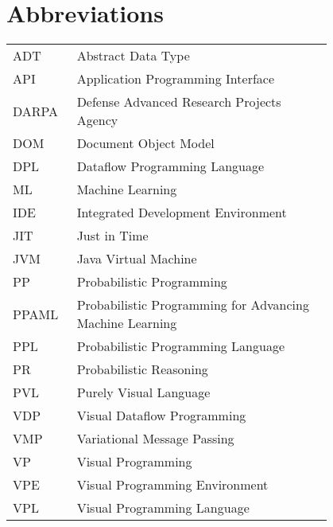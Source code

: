 \chapter*{Abbreviations}

\begin{flushleft}
\begin{tabular}{l p{0.8\linewidth}}
ADT      & Abstract Data Type\\
API      & Application Programming Interface\\
DARPA    & Defense Advanced Research Projects Agency\\
DOM      & Document Object Model\\
DPL      & Dataflow Programming Language\\
ML       & Machine Learning\\
IDE      & Integrated Development Environment\\
JIT      & Just in Time\\
JVM      & Java Virtual Machine\\
PP       & Probabilistic Programming\\
PPAML    & Probabilistic Programming for Advancing Machine Learning\\
PPL      & Probabilistic Programming Language\\
PR       & Probabilistic Reasoning\\
PVL      & Purely Visual Language\\
VDP      & Visual Dataflow Programming\\
VMP      & Variational Message Passing\\
VP       & Visual Programming\\
VPE      & Visual Programming Environment\\
VPL      & Visual Programming Language
\end{tabular}
\end{flushleft}
